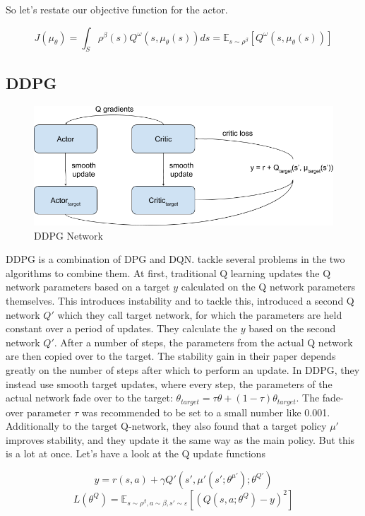 \documentclass[hyperref,german,beleg]{cgvpub}
\begin{document}
So let's restate our objective function for the actor.

\begin{equation}
J(\mu_{\theta}) = \int_S \rho^{\beta}(s) Q^{\omega}(s,\mu_{\theta}(s)) ds = \mathbb{E}_{s \sim \rho^{\beta}}[Q^{\omega}(s,\mu_{\theta}(s))]
\end{equation}


\subsection{DDPG}

\begin{figure}
  \centering
  \includegraphics[width=0.6\linewidth]{DDPG_Setup.png}
  \caption{DDPG Network}
  \label{fig:ddpgsetup}
\end{figure}

\ac{DDPG} is a combination of \ac{DPG} and \ac{DQN}. \cite{lillicrapCONTINUOUSCONTROLDEEP2015} tackle several problems in the two algorithms to combine them. At first, traditional Q learning updates the Q network parameters based on a target $y$ calculated on the Q network parameters themselves. This introduces instability and to tackle this, \cite{mnihPlayingAtariDeep2013} introduced a second Q network $Q'$ which they call target network, for which the parameters are held constant over a period of updates. They calculate the $y$ based on the second network $Q'$. After a number of steps, the parameters from the actual Q network are then copied over to the target. The stability gain in their paper depends greatly on the number of steps after which to perform an update. In \ac{DDPG}, they instead use smooth target updates, where every step, the parameters of the actual network fade over to the target: $\theta_{target} = \tau \theta + (1 - \tau) \theta_{target}$. The fade-over parameter $\tau$ was recommended to be set to a small number like 0.001. Additionally to the target Q-network, they also found that a target policy $\mu'$ improves stability, and they update it the same way as the main policy. But this is a lot at once. Let's have a look at the Q update functions

\begin{equation}
y = r(s, a) + \gamma Q'(s', \mu'(s';\theta^{\mu'});\theta^{Q'})
\end{equation}
\begin{equation}
L(\theta^Q) = \mathbb{E}_{s \sim \rho^{\beta}, a \sim \beta, s' \sim \varepsilon}[(Q(s, a;\theta^Q) - y)^2]
\end{equation}
\end{document}
